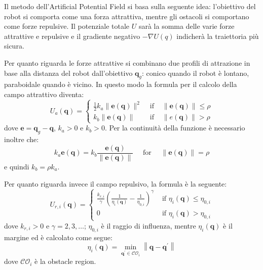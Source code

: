 \documentclass[Lau, binding=0.6cm, oneside]{sapthesis}
\begin{document}
Il metodo dell'Artificial Potential Field si basa sulla seguente idea: l'obiettivo del robot si comporta come una forza attrattiva, mentre gli ostacoli si comportano come forze repulsive.
Il potenziale totale $U$ sarà la somma delle varie forze attrattive e repulsive e il gradiente negativo $-\nabla U(q)$ indicherà la traiettoria più sicura.

Per quanto riguarda le forze attrattive si combinano due profili di attrazione in base alla distanza del robot dall'obiettivo $\boldsymbol{q}_{g}$: conico quando il robot è lontano, paraboidale quando è vicino.
In questo modo la formula per il calcolo della campo attrattivo diventa:
\newline
$$
U_{a}(\boldsymbol{q})=\left\{\begin{array}{cll}
\frac{1}{2} k_{a}\|\boldsymbol{e}(\boldsymbol{q})\|^{2} & \text { if } & \|\boldsymbol{e}(\boldsymbol{q})\| \leq \rho \\
k_{b}\|\boldsymbol{e}(\boldsymbol{q})\| & \text { if } & \|e(\boldsymbol{q})\|>\rho
\end{array}\right.
$$
\newline
dove $\boldsymbol{e}=\boldsymbol{q}_{g}-\boldsymbol{q}$, $k_{a}>0$ e $k_{b}>0$.
Per la continuità della funzione è necessario inoltre che:
$$
k_{a} \boldsymbol{e}(\boldsymbol{q})=k_{b} \frac{\boldsymbol{e}(\boldsymbol{q})}{\|\boldsymbol{e}(\boldsymbol{q})\|} \quad \text { for } \quad\|\boldsymbol{e}(\boldsymbol{q})\|=\rho
$$
\newline
e quindi $k_{b}=\rho k_{a}$.

Per quanto riguarda invece il campo repulsivo, la formula è la seguente:
\newline
$$
U_{r, i}(\boldsymbol{q})=\left\{\begin{array}{ll}
\frac{k_{r, i}}{\gamma}\left(\frac{1}{\eta_{i}(\boldsymbol{q})}-\frac{1}{\eta_{0, i}}\right)^{\gamma} & \text { if } \eta_{i}(\boldsymbol{q}) \leq \eta_{0, i} \\
0 & \text { if } \eta_{i}(\boldsymbol{q})>\eta_{0, i}
\end{array}\right.
$$
\newline
dove $k_{r, i}>0$ e $\gamma=2,3, \ldots$; $\eta_{0, i}$ è il raggio di influenza, mentre $\eta_{i}(\boldsymbol{q})$ è il margine ed è calcolato come segue:
$$
\eta_{i}(\boldsymbol{q})=\min _{\boldsymbol{q}^{\prime} \in \mathcal{C O}_{i}}\left\|\boldsymbol{q}-\boldsymbol{q}^{\prime}\right\|
$$
\newline
dove $\mathcal{C O}_{i}$ è la obstacle region.
\end{document}
